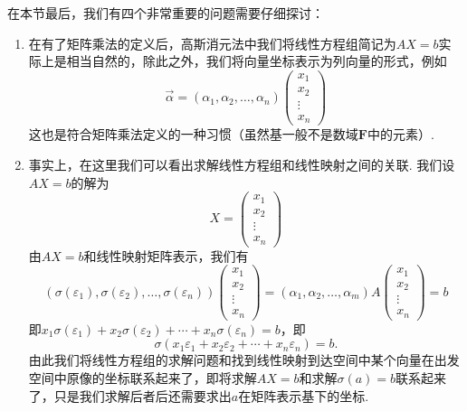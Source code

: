在本节最后，我们有四个非常重要的问题需要仔细探讨：
\begin{enumerate}
    \item 在有了矩阵乘法的定义后，高斯消元法中我们将线性方程组简记为$AX=b$实际上是相当自然的，除此之外，我们将向量坐标表示为列向量的形式，例如
          \[\vec{\alpha}=(\alpha_1,\alpha_2,\ldots,\alpha_n)\begin{pmatrix}
                  x_1 \\ x_2 \\ \vdots \\ x_n
              \end{pmatrix}\]
          这也是符合矩阵乘法定义的一种习惯（虽然基一般不是数域$\mathbf{F}$中的元素）.

    \item 事实上，在这里我们可以看出求解线性方程组和线性映射之间的关联. 我们设$AX=b$的解为
          \[X=\begin{pmatrix}
                  x_1 \\ x_2 \\ \vdots \\ x_n
              \end{pmatrix}\]
          由$AX=b$和线性映射矩阵表示，我们有
          \begin{equation}\label{eq:7:方程组与核空间1}
              (\sigma(\varepsilon_1),\sigma(\varepsilon_2),\ldots,\sigma(\varepsilon_n))\begin{pmatrix}
                  x_1 \\ x_2 \\ \vdots \\ x_n
              \end{pmatrix}=(\alpha_1,\alpha_2,\ldots,\alpha_m)A\begin{pmatrix}
                  x_1 \\ x_2 \\ \vdots \\ x_n
              \end{pmatrix}=b
          \end{equation}
          即$x_1\sigma(\varepsilon_1)+x_2\sigma(\varepsilon_2)+\cdots+x_n\sigma(\varepsilon_n)=b$，即
          \begin{equation}\label{eq:7:方程组与核空间2}
              \sigma(x_1\varepsilon_1+x_2\varepsilon_2+\cdots+x_n\varepsilon_n)=b.
          \end{equation}
          由此我们将线性方程组的求解问题和找到线性映射到达空间中某个向量在出发空间中原像的坐标联系起来了，即将求解$AX=b$和求解$\sigma(a)=b$联系起来了，只是我们求解后者后还需要求出$a$在矩阵表示基下的坐标.


\end{enumerate}
